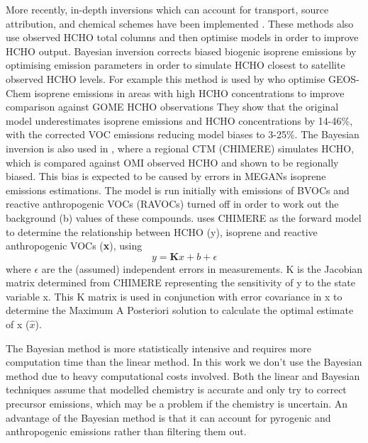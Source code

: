       More recently, in-depth inversions which can account for transport, source attribution, and chemical schemes have been implemented \parencite{FortemsCheiney2012}.
      These methods also use observed HCHO total columns and then optimise models in order to improve HCHO output.
      Bayesian inversion corrects biased biogenic isoprene emissions by optimising emission parameters in order to simulate HCHO closest to satellite observed HCHO levels.
      For example this method is used by \textcite{Shim2005} who optimise GEOS-Chem isoprene emissions in areas with high HCHO concentrations to improve comparison against GOME HCHO observations %
      They show that the original model underestimates isoprene emissions and HCHO concentrations by 14-46\%, with the corrected VOC emissions reducing model biases to 3-25\%.
      The Bayesian inversion is also used in \textcite{Curci2010}, where a regional CTM (CHIMERE) simulates HCHO, which is compared against OMI observed HCHO and shown to be regionally biased.
      This bias is expected to be caused by errors in MEGANs isoprene emissions estimations.
      The model is run initially with emissions of BVOCs and reactive anthropogenic VOCs (RAVOCs) turned off in order to work out the background (b) values of these compounds.
      \textcite{Curci2010} uses CHIMERE as the forward model to determine the relationship between HCHO (y), isoprene and reactive anthropogenic VOCs (\textbf{x}), using 
      \begin{equation}
        y=\mathbf{K}x + b + \epsilon
      \end{equation}
      where $\epsilon$ are the (assumed) independent errors in measurements.
      K is the Jacobian matrix determined from CHIMERE representing the sensitivity of y to the state variable x.
      This K matrix is used in conjunction with error covariance in x to determine the Maximum A Posteriori solution to calculate the optimal estimate of x ($\hat{x}$).
    
      The Bayesian method is more statistically intensive and requires more computation time than the linear method. 
      In this work we don't use the Bayesian method due to heavy computational costs involved.
      Both the linear and Bayesian techniques assume that modelled chemistry is accurate and only try to correct precursor emissions, which may be a problem if the chemistry is uncertain.
      An advantage of the Bayesian method is that it can account for pyrogenic and anthropogenic emissions rather than filtering them out.
      
